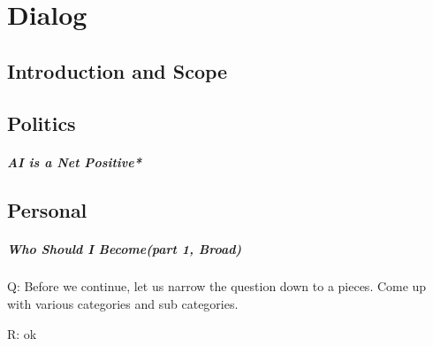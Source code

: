 \chapter{Dialog}

\section{Introduction and Scope}



\section{Politics}

\paragraph{AI is a Net Positive*}

\section{Personal}

\paragraph{Who Should I Become(part 1, Broad)}

Q: Before we continue, let us narrow the question down to a pieces. Come up with various categories and sub categories.

R: ok

